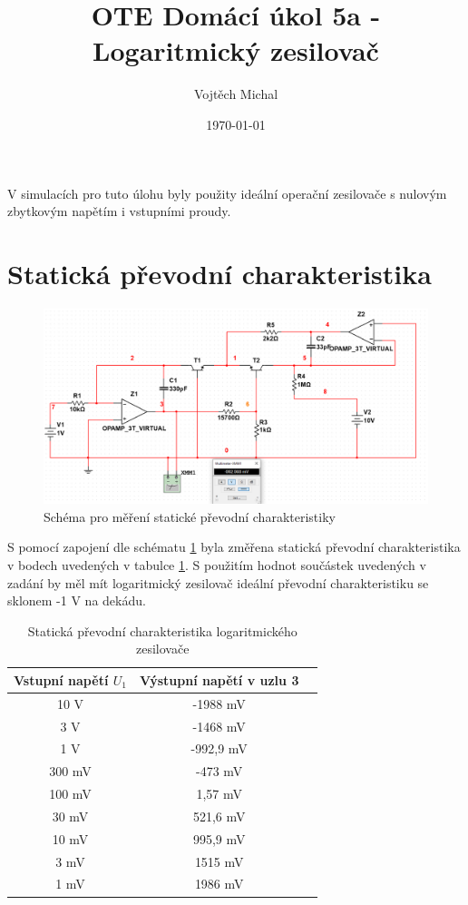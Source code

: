 \documentclass[twoside]{article}
\title{OTE Domácí úkol 5a - Logaritmický zesilovač}
\author{Vojtěch Michal}
\date{\today}
\begin{document}
\maketitle

V simulacích pro tuto úlohu byly použity ideální operační zesilovače s nulovým 
zbytkovým napětím i vstupními proudy.

\section{Statická převodní charakteristika}

\begin{figure}[h!]
    \centering
    \includegraphics[width=0.65\linewidth]{staticka_schema.png}
    \caption{Schéma pro měření statické převodní charakteristiky}
    \label{fig:staticka_schema}
\end{figure}

S pomocí zapojení dle schématu \ref{fig:staticka_schema} byla změřena statická převodní charakteristika
v bodech uvedených v tabulce \ref{table:prevodni}. S použitím hodnot součástek uvedených v zadání
by měl mít logaritmický zesilovač ideální převodní charakteristiku se sklonem -1 V na dekádu.

\begin{table}[h!]
    \centering
    \begin{tabular}{c|c|c}
        Vstupní napětí $U_1$ & Výstupní napětí v uzlu 3 \\ \hline
        10 V & -1988 mV \\
        3 V & -1468 mV \\
        1 V & -992,9 mV \\
        300 mV & -473 mV \\
        100 mV & 1,57 mV \\
        30 mV & 521,6 mV \\
        10 mV & 995,9 mV \\
        3 mV & 1515 mV \\
        1 mV & 1986 mV
    \end{tabular}
    \caption{Statická převodní charakteristika logaritmického zesilovače}
    \label{table:prevodni}
\end{table}
\end{document}
